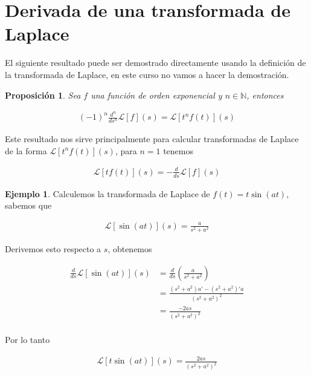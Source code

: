 \documentclass{article}
\theoremstyle{plain}
\newtheorem{prop}[thm]{Proposición}
\theoremstyle{definition}
\newtheorem{ejem}[thm]{Ejemplo}
\begin{document}
\newpage




\section{Derivada de una transformada de Laplace}

El siguiente resultado puede ser demostrado directamente usando la definición de la transformada de Laplace, en este curso no vamos a hacer la demostración. \\

\begin{prop}Sea $f$ una función de orden exponencial y $n \in \mathbb{N}$, entonces
\end{prop}

\begin{align*}
    (-1)^n \frac{d^n}{ds^n} \mathcal{L}[f](s) = \mathcal{L}[t^nf(t)](s)
\end{align*}

Este resultado nos sirve principalmente para calcular transformadas de Laplace de la forma $\mathcal{L}[t^nf(t)](s)$, para $n=1$ tenemos


\begin{align*}
     \mathcal{L}[tf(t)](s) = -\frac{d}{ds} \mathcal{L}[f](s)
\end{align*}

\begin{ejem}Calculemos la transformada de Laplace de $f(t) =t\sin(at) $, sabemos que
\end{ejem}

\begin{align*}
    \mathcal{L}[\sin(at)](s) = \frac{a}{s^2+a^2}
\end{align*}

Derivemos esto respecto a $s$, obtenemos

\begin{align*}
    \frac{d}{ds} \mathcal{L}[\sin(at)](s) &=  \frac{d}{ds} \left( \frac{a}{s^2+a^2} \right) \\
    &=  \frac{(s^2+a^2)a'-(s^2+a^2)'a}{(s^2+a^2)^2} \\
    &=  \frac{-2as}{(s^2+a^2)^2} \\
\end{align*}

Por lo tanto


\begin{align*}
    \mathcal{L}[t\sin(at)](s) = \frac{2as}{(s^2+a^2)^2}
\end{align*}
\end{document}
